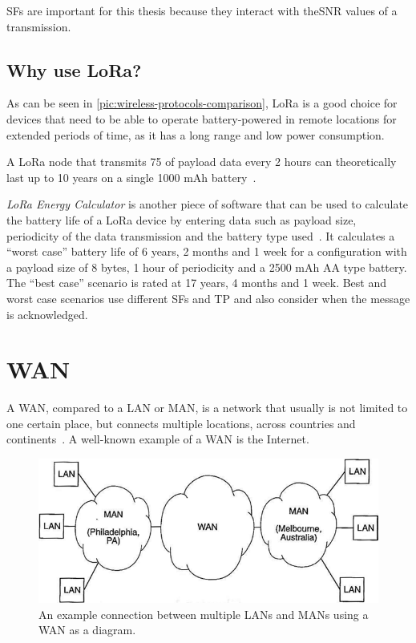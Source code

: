 \aclp{SF} are important for this thesis because they interact with the\ac{SNR} values of a transmission.


\subsection{Why use \acs{LoRa}?}

As can be seen in \cref{pic:wireless-protocols-comparison}, \ac{LoRa} is a good choice for devices that need to be able to operate battery-powered in remote locations for extended periods of time, as it has a long range and low power consumption.

A \ac{LoRa} node that transmits \SI{75}{\byte} of payload data every 2 hours can theoretically last up to 10 years on a single 1000 mAh battery~\cite{cheong_comparison_2017}.

\emph{LoRa Energy Calculator} is another piece of software that can be used to calculate the battery life of a \ac{LoRa} device by entering data such as payload size, periodicity of the data transmission and the battery type used~\cite{dramco_research_group_lora_2023}.
It calculates a ``worst case'' battery life of 6 years, 2 months and 1 week for a configuration with a payload size of 8 bytes, 1 hour of periodicity and a 2500 mAh AA type battery.
The ``best case'' scenario is rated at 17 years, 4 months and 1 week.
Best and worst case scenarios use different \aclp{SF} and \ac{TP} and also consider when the message is acknowledged.

\section{\acf{WAN}}

A \ac{WAN}, compared to a \acf{LAN} or \acf{MAN}, is a network that usually is not limited to one certain place, but connects multiple locations, across countries and continents~\cite[p. 2]{sadiku_fundamentals_2022}.
A well-known example of a \ac{WAN} is the Internet.

\begin{figure}[htbp]
    \centering
    \includegraphics[width=.6\textwidth]{pictures/lorawan-structure/wan_diagram.png}
    \caption{
        An example connection between multiple \acfp{LAN} and \acfp{MAN} using a \acf{WAN} as a diagram.\protect\cite{sadiku_fundamentals_2022}
    }\label{pic:wan-diagram}
\end{figure}

